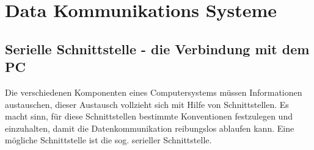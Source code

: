 %



\chapter{Data Kommunikations Systeme}
\section{Serielle Schnittstelle - die Verbindung mit dem PC}

Die verschiedenen Komponenten eines Computersystems müssen Informationen austauschen, dieser Austausch vollzieht sich mit Hilfe von Schnittstellen. Es macht sinn, für diese Schnittstellen bestimmte Konventionen festzulegen und einzuhalten, damit die Datenkommunikation reibungslos ablaufen kann. Eine mögliche Schnittstelle ist die sog. serieller Schnittstelle.

